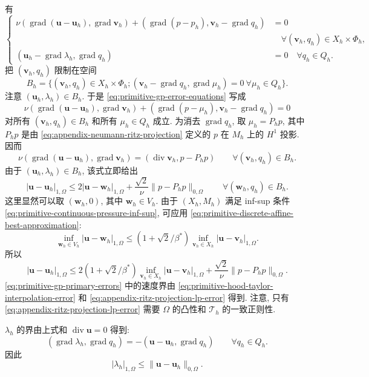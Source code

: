 \begin{Proof}
有
\begin{equation}\label{eq:primitive-gp-error-equations}
\left\{
\begin{aligned}
\nu(\operatorname{grad}(\mathbf u-\mathbf u_h),\operatorname{grad}\mathbf v_h)
+(\operatorname{grad}(p-p_h),\mathbf v_h-\operatorname{grad}q_h)&=0\\
&\quad\forall(\mathbf v_h,q_h)\in X_h\times\Phi_h,\\
(\mathbf u_h-\operatorname{grad}\lambda_h,
\operatorname{grad}q_h)&=0
\quad\forall q_h\in Q_h.
\end{aligned}
\right.
\end{equation}
把 $(\mathbf v_h,q_h)$ 限制在空间
\[
B_h=\{(\mathbf v_h,q_h)\in X_h\times\Phi_h;
(\mathbf v_h-\operatorname{grad}q_h,\operatorname{grad}\mu_h)=0
\ \forall\mu_h\in Q_h\}.
\]
注意 $(\mathbf u_h,\lambda_h)\in B_h$. 于是
\eqref{eq:primitive-gp-error-equations} 写成
\[
\nu(\operatorname{grad}(\mathbf u-\mathbf u_h),\operatorname{grad}\mathbf v_h)
+(\operatorname{grad}(p-\mu_h),
\mathbf v_h-\operatorname{grad}q_h)=0
\]
对所有 $(\mathbf v_h,q_h)\in B_h$ 和所有 $\mu_h\in Q_h$ 成立.
为消去 $\operatorname{grad}q_h$, 取
$\mu_h=P_hp$, 其中 $P_hp$ 是由
\eqref{eq:appendix-neumann-ritz-projection} 定义的 $p$ 在 $M_h$ 上的
$H^1$ 投影. 因而
\[
\nu(\operatorname{grad}(\mathbf u-\mathbf u_h),\operatorname{grad}\mathbf v_h)
=(\operatorname{div}\mathbf v_h,p-P_hp)
\qquad\forall(\mathbf v_h,q_h)\in B_h.
\]
由于 $(\mathbf u_h,\lambda_h)\in B_h$, 该式立即给出
\[
|\mathbf u-\mathbf u_h|_{1,\Omega}
\leq2|\mathbf u-\mathbf w_h|_{1,\Omega}
+\frac{\sqrt2}{\nu}\|p-P_hp\|_{0,\Omega}
\qquad\forall(\mathbf w_h,q_h)\in B_h.
\]
这里显然可以取 $(\mathbf w_h,0)$, 其中 $\mathbf w_h\in V_h$.
由于 $(X_h,M_h)$ 满足 inf-sup 条件
\eqref{eq:primitive-continuous-pressure-inf-sup}, 可应用
\eqref{eq:primitive-discrete-affine-best-approximation}:
\[
\inf_{\mathbf w_h\in V_h}|\mathbf u-\mathbf w_h|_{1,\Omega}
\leq(1+\sqrt2/\beta^*)
\inf_{\mathbf v_h\in X_h}|\mathbf u-\mathbf v_h|_{1,\Omega}.
\]
所以
\[
|\mathbf u-\mathbf u_h|_{1,\Omega}
\leq2(1+\sqrt2/\beta^*)
\inf_{\mathbf v_h\in X_h}|\mathbf u-\mathbf v_h|_{1,\Omega}
+\frac{\sqrt2}{\nu}\|p-P_hp\|_{0,\Omega}.
\]
\eqref{eq:primitive-gp-primary-errors} 中的速度界由
\eqref{eq:primitive-hood-taylor-interpolation-error} 和
\eqref{eq:appendix-ritz-projection-lp-error} 得到. 注意, 只有
\eqref{eq:appendix-ritz-projection-lp-error} 需要 $\Omega$ 的凸性和
$\mathcal T_h$ 的一致正则性.

$\lambda_h$ 的界由上式和 $\operatorname{div}\mathbf u=0$ 得到:
\begin{equation}\label{eq:primitive-gp-correction-identity}
(\operatorname{grad}\lambda_h,\operatorname{grad}q_h)
=-(\mathbf u-\mathbf u_h,\operatorname{grad}q_h)
\qquad\forall q_h\in Q_h.
\end{equation}
因此
\[
|\lambda_h|_{1,\Omega}\leq\|\mathbf u-\mathbf u_h\|_{0,\Omega}.
\]


\end{Proof}
